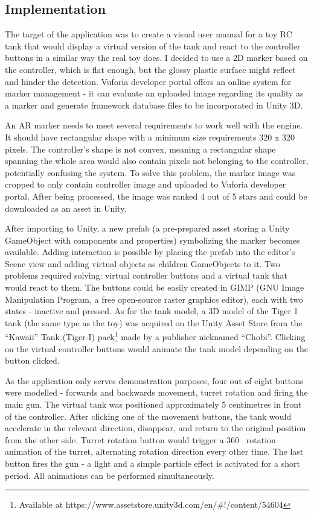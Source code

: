 \documentclass[12pt, a4paper]{article}
\begin{document}
\subsection{Implementation}
The target of the application was to create a visual user manual for a toy RC tank that would display a virtual version of the tank and react to the controller buttons in a similar way the real toy does. I decided to use a 2D marker based on the controller, which is flat enough, but the glossy plastic surface might reflect and hinder the detection. Vuforia developer portal offers an online system for marker management - it can evaluate an uploaded image regarding its quality as a marker and generate framework database files to be incorporated in Unity 3D.

An AR marker needs to meet several requirements to work well with the engine. It should have rectangular shape with a minimum size requirements 320 x 320 pixels. The controller’s shape is not convex, meaning a rectangular shape spanning the whole area would also contain pixels not belonging to the controller, potentially confusing the system. To solve this problem, the marker image was cropped to only contain controller image and uploaded to Vuforia developer portal. After being processed, the image was ranked 4 out of 5 stars and could be downloaded as an asset in Unity.

After importing to Unity, a new prefab (a pre-prepared asset storing a Unity GameObject with components and properties) symbolizing the marker becomes available. Adding interaction is possible by placing the prefab into the editor’s Scene view and adding virtual objects as children GameObjects to it. Two problems required solving: virtual controller buttons and a virtual tank that would react to them. The buttons could be easily created in GIMP (GNU Image Manipulation Program, a free open-source raster graphics editor), each with two states - inactive and pressed. As for the tank model, a 3D model of the Tiger 1 tank (the same type as the toy) was acquired on the Unity Asset Store from the “Kawaii” Tank (Tiger-I) pack\footnote{Available at https://www.assetstore.unity3d.com/en/\#!/content/54604} made by a publisher nicknamed “Chobi”. Clicking on the virtual controller buttons would animate the tank model depending on the button clicked.

As the application only serves demonstration purposes, four out of eight buttons were modelled - forwards and backwards movement, turret rotation and firing the main gun. The virtual tank was positioned approximately 5 centimetres in front of the controller. After clicking one of the movement buttons, the tank would accelerate in the relevant direction, disappear, and return to the original position from the other side. Turret rotation button would trigger a 360\degree~ rotation animation of the turret, alternating rotation direction every other time. The last button fires the gun - a light and a simple particle effect is activated for a short period. All animations can be performed simultaneously.
\end{document}
